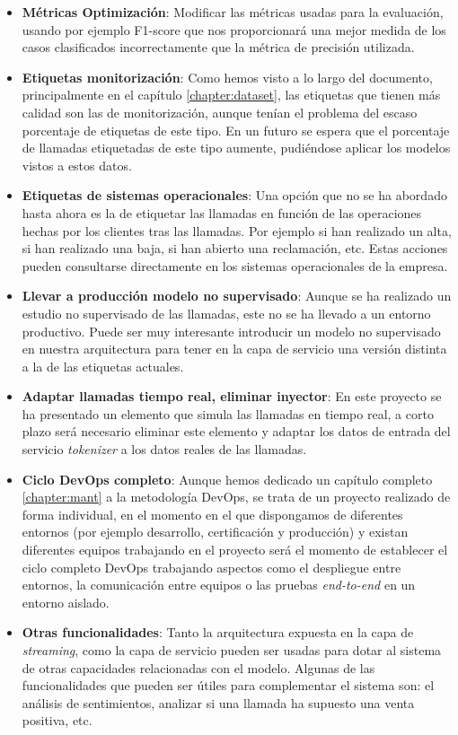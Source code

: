 \begin{itemize}
	\item \textbf{Métricas Optimización}: Modificar las métricas usadas para la evaluación, usando por ejemplo F1-score que nos proporcionará una mejor medida de los casos clasificados incorrectamente que la métrica de precisión utilizada.
	\item \textbf{Etiquetas monitorización}: Como hemos visto a lo largo del documento, principalmente en el capítulo \ref{chapter:dataset}, las etiquetas que tienen más calidad son las de monitorización, aunque tenían el problema del escaso porcentaje de etiquetas de este tipo. En un futuro se espera que el porcentaje de llamadas etiquetadas de este tipo aumente, pudiéndose aplicar los modelos vistos a estos datos.
	\item \textbf{Etiquetas de sistemas operacionales}: Una opción que no se ha abordado hasta ahora es la de etiquetar las llamadas en función de las operaciones hechas por los clientes tras las llamadas. Por ejemplo si han realizado un alta, si han realizado una baja, si han abierto una reclamación, etc. Estas acciones pueden consultarse directamente en los sistemas operacionales de la empresa.
	\item \textbf{Llevar a producción modelo no supervisado}: Aunque se ha realizado un estudio no supervisado de las llamadas, este no se ha llevado a un entorno productivo. Puede ser muy interesante introducir un modelo no supervisado en nuestra arquitectura para tener en la capa de servicio una versión distinta a la de las etiquetas actuales. 
	\item \textbf{Adaptar llamadas tiempo real, eliminar inyector}: En este proyecto se ha presentado un elemento que simula las llamadas en tiempo real, a corto plazo será necesario eliminar este elemento y adaptar los datos de entrada del servicio \textit{tokenizer} a los datos reales de las llamadas. 
	
	\item \textbf{Ciclo DevOps completo}: Aunque hemos dedicado un capítulo completo \ref{chapter:mant} a la metodología DevOps, se trata de un proyecto realizado de forma individual, en el momento en el que dispongamos de diferentes entornos (por ejemplo desarrollo, certificación y producción) y existan diferentes equipos trabajando en el proyecto será el momento de establecer el ciclo completo DevOps trabajando aspectos como el despliegue entre entornos, la comunicación entre equipos o las pruebas \textit{end-to-end} en un entorno aislado.
	
	
	\item \textbf{Otras funcionalidades}: Tanto la arquitectura expuesta en la capa de \textit{streaming}, como la capa de servicio pueden ser usadas para dotar al sistema de otras capacidades relacionadas con el modelo. Algunas de las funcionalidades que pueden ser útiles para complementar el sistema son: el análisis de sentimientos, analizar si una llamada ha supuesto una venta positiva, etc. 


\end{itemize}

